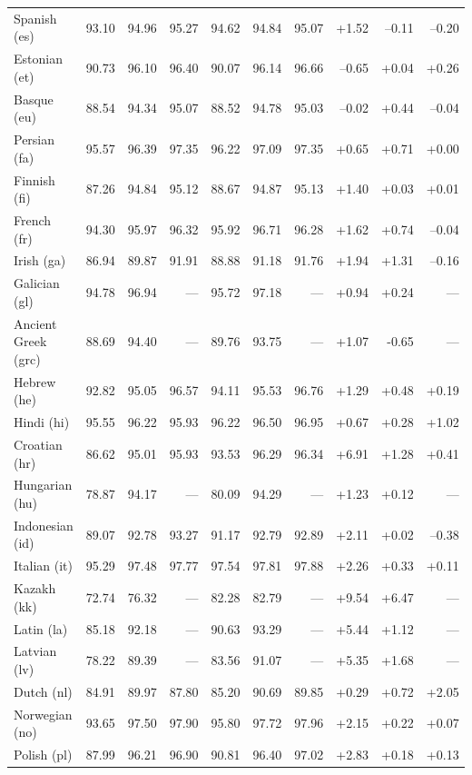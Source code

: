 \documentclass[11pt,letterpaper]{article}
\begin{document}
\begin{table}
\begin{tabular}{l|rrr|rrr|rrr}
Spanish (es) & 93.10 & 94.96 & 95.27 & 94.62 & 94.84 & 95.07 & +1.52 & --0.11 & --0.20\\
Estonian (et) & 90.73 & 96.10 & 96.40 & 90.07 & 96.14 & 96.66 & --0.65 & +0.04 & +0.26\\
Basque (eu) & 88.54 & 94.34 & 95.07 & 88.52 & 94.78 & 95.03 & --0.02 & +0.44 & --0.04\\
Persian (fa) & 95.57 & 96.39 & 97.35 & 96.22 & 97.09 & 97.35 & +0.65 & +0.71 & +0.00\\
Finnish (fi) & 87.26 & 94.84 & 95.12 & 88.67 & 94.87 & 95.13 & +1.40 & +0.03 & +0.01\\
French (fr) & 94.30 & 95.97 & 96.32 & 95.92 & 96.71 & 96.28 & +1.62 & +0.74 & --0.04\\
Irish (ga) & 86.94 & 89.87 & 91.91 & 88.88 & 91.18 & 91.76 & +1.94 & +1.31 & --0.16\\
Galician (gl) & 94.78 & 96.94 & --- & 95.72 & 97.18 & --- & +0.94 & +0.24 & ---\\
Ancient Greek (grc) & 88.69 & 94.40 & --- & 89.76 & 93.75 & --- & +1.07 & -0.65 & ---\\
Hebrew (he) & 92.82 & 95.05 & 96.57 & 94.11 & 95.53 & 96.76 & +1.29 & +0.48 & +0.19\\
Hindi (hi) & 95.55 & 96.22 & 95.93 & 96.22 & 96.50 & 96.95 & +0.67 & +0.28 & +1.02\\
Croatian (hr) & 86.62 & 95.01 & 95.93 & 93.53 & 96.29 & 96.34 & +6.91 & +1.28 & +0.41\\
Hungarian (hu) & 78.87 & 94.17 & --- & 80.09 & 94.29 & --- & +1.23 & +0.12 & ---\\
Indonesian (id) & 89.07 & 92.78 & 93.27 & 91.17 & 92.79 & 92.89 & +2.11 & +0.02 & --0.38\\
Italian (it) & 95.29 & 97.48 & 97.77 & 97.54 & 97.81 & 97.88 & +2.26 & +0.33 & +0.11\\
Kazakh (kk) & 72.74 & 76.32 & --- & 82.28 & 82.79 & --- & +9.54 & +6.47 & ---\\
Latin (la) & 85.18 & 92.18 & --- & 90.63 & 93.29 & --- & +5.44 & +1.12 & ---\\
Latvian (lv) & 78.22 & 89.39 & --- & 83.56 & 91.07 & --- & +5.35 & +1.68 & ---\\
Dutch (nl) & 84.91 & 89.97 & 87.80 & 85.20 & 90.69 & 89.85 & +0.29 & +0.72 & +2.05\\
Norwegian (no) & 93.65 & 97.50 & 97.90 & 95.80 & 97.72 & 97.96 & +2.15 & +0.22 & +0.07\\
Polish (pl) & 87.99 & 96.21 & 96.90 & 90.81 & 96.40 & 97.02 & +2.83 & +0.18 & +0.13\\

\end{tabular}
\end{table}
\end{document}
